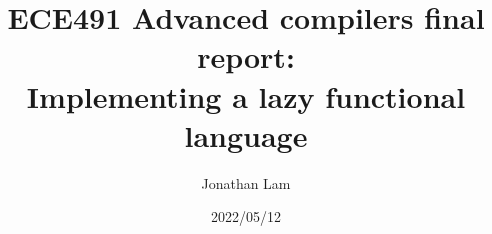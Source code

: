 \documentclass{article}
\title{
  ECE491 Advanced compilers final report: \\
  Implementing a lazy functional language
}
\author{Jonathan Lam}
\date{2022/05/12}
\begin{document}
\maketitle{}

\tableofcontents{}









\end{document}

